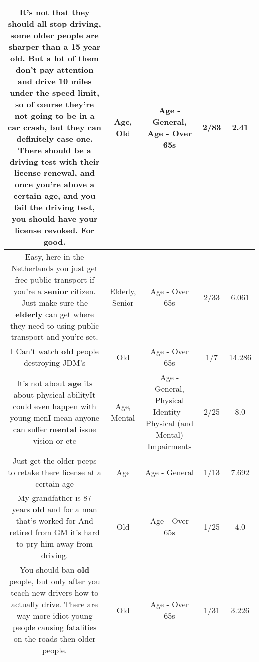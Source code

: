 \documentclass[11pt]{article}
\newlength\mylength
\begin{document}
\begin{center}
\begin{longtable}{|C{.65\mylength}|C{.30\mylength}|C{.12\mylength}|C{.12\mylength}|C{.12\mylength}|}
  \small It's not that they should all stop driving, some older people are sharper than a 15 year \textbf{old}. But a lot of them don't pay attention and drive 10 miles under the speed limit, so of course they're not going to be in a car crash, but they can definitely case one. There should be a driving test with their license renewal, and once you're above a certain \textbf{age}, and you fail the driving test, you should have your license revoked. For good.\normalsize   & Age, Old & Age - General, Age - Over 65s & 2/83 & 2.41 \\  \hline
  \small Easy, here in the Netherlands you just get free public transport if you're a \textbf{senior} citizen. Just make sure the \textbf{elderly} can get where they need to using public transport and you're set.\normalsize   & Elderly, Senior & Age - Over 65s & 2/33 & 6.061 \\  \hline
  \small I Can't watch \textbf{old} people destroying JDM's\normalsize   & Old & Age - Over 65s & 1/7 & 14.286 \\  \hline
  \small It's not about \textbf{age} its about physical abilityIt could even happen with young menI mean anyone can suffer \textbf{mental} issue vision or etc\normalsize   & Age, Mental & Age - General, Physical Identity - Physical (and Mental) Impairments & 2/25 & 8.0 \\  \hline
  \small Just get the older peeps to retake there license at a certain age\normalsize   & Age & Age - General & 1/13 & 7.692 \\  \hline
  \small My grandfather is 87 years \textbf{old} and for a man that's worked for And retired from GM it's hard to pry him away from driving.\normalsize   & Old & Age - Over 65s & 1/25 & 4.0 \\  \hline
  \small You should ban \textbf{old} people, but only after you teach new drivers how to actually drive. There are way more idiot young people causing fatalities on the roads then older people.\normalsize   & Old & Age - Over 65s & 1/31 & 3.226 \\  \hline

\end{longtable}
\end{center}
\end{document}
